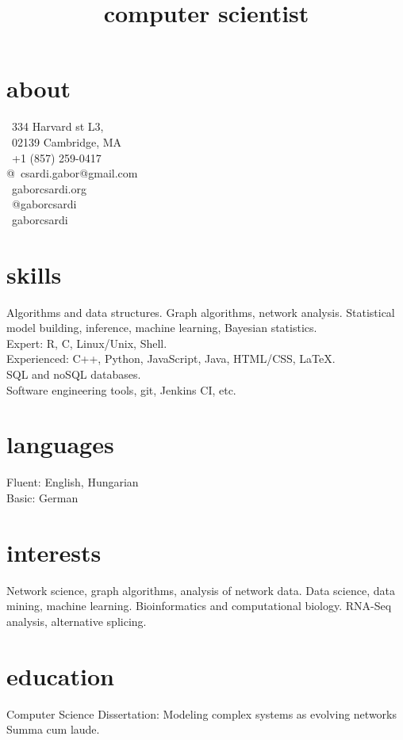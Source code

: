 \documentclass[11pt]{moderncv}
\title{computer scientist}
\begin{document}
\RaggedRight

\makecvtitle

\begin{aside}
\section{about}
\faEnvelope\ 334 Harvard st L3,\\
\textcolor{color4}{\faEnvelope}\ 02139 Cambridge, MA\\
\faPhone\ +1 (857) 259-0417\\
@\ \nolinebreak{}csardi.gabor@gmail.com\\
\faGlobe\ gaborcsardi.org\\
\faTwitter\ @gaborcsardi\\
\faGithub\ gaborcsardi
\section{skills}
Algorithms and data structures.
Graph algorithms, network analysis.
Statistical model building, inference,
machine learning, Bayesian statistics.\\[6pt]
Expert: R, C, Linux/Unix, Shell.\\
Experienced: C++, Python, JavaScript,
  Java, HTML/CSS, \LaTeX.\\[6pt]
SQL and noSQL databases.\\[6pt]
Software engineering tools,
git, Jenkins CI, etc.

\section{languages}
Fluent: English, Hungarian\\
Basic: German
\end{aside}

\section{interests}

Network science, graph algorithms, analysis of network data.
Data science, data mining, machine learning.
Bioinformatics and computational biology. RNA-Seq analysis,
alternative splicing.

\section{education}

%
{Computer Science}%
{Dissertation: Modeling complex systems as evolving networks\\
Summa cum laude.}
\end{document}
